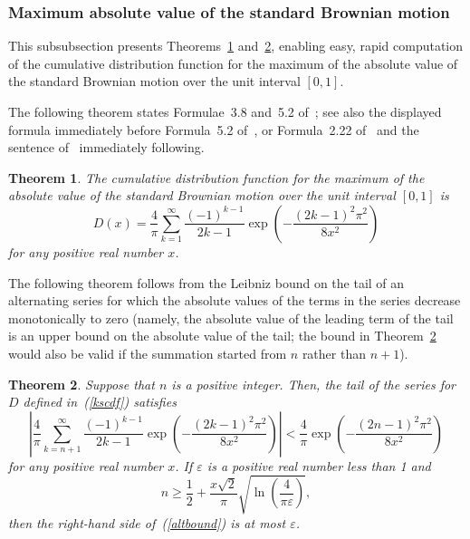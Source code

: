 \documentclass[12pt]{article}
\newtheorem{theorem}{Theorem}[]
\def\epsilon{\varepsilon}
\begin{document}
\subsubsection{Maximum absolute value of the standard Brownian motion}
\label{maxBrownian}

This subsubsection presents Theorems~\ref{maincombomax}
and~\ref{mainboundmax}, enabling easy, rapid computation
of the cumulative distribution function for the maximum
of the absolute value of the standard Brownian motion
over the unit interval $[0, 1]$.

The following theorem states Formulae~3.8 and~5.2
of~\citet{darling-siegert}; see also the displayed formula immediately before
Formula~5.2 of~\citet{darling-siegert},
or Formula~2.22 of~\citet{ciesielski-taylor}
and the sentence of~\citet{ciesielski-taylor} immediately following.
%
\begin{theorem}
\label{maincombomax}
The cumulative distribution function for the maximum of the absolute value
of the standard Brownian motion over the unit interval $[0, 1]$ is
%
\begin{equation}
\label{kscdf}
D(x) = \frac{4}{\pi} \sum_{k=1}^\infty \frac{(-1)^{k-1}}{2k-1}
\exp\left(-\frac{(2k-1)^2 \pi^2}{8x^2}\right)
\end{equation}
%
for any positive real number $x$.
\end{theorem}


The following theorem follows from the Leibniz bound on the tail
of an alternating series for which the absolute values of the terms
in the series decrease monotonically to zero (namely, the absolute value
of the leading term of the tail is an upper bound on the absolute value
of the tail; the bound in Theorem~\ref{mainboundmax} would also be valid
if the summation started from $n$ rather than $n+1$).
%
\begin{theorem}
\label{mainboundmax}
Suppose that $n$ is a positive integer.
Then, the tail of the series for $D$ defined in~(\ref{kscdf}) satisfies
%
\begin{equation}
\label{altbound}
\left| \frac{4}{\pi} \sum_{k=n+1}^\infty \frac{(-1)^{k-1}}{2k-1}
\exp\left(-\frac{(2k-1)^2 \pi^2}{8x^2}\right) \right|
< \frac{4}{\pi} \exp\left(-\frac{(2n-1)^2 \pi^2}{8x^2}\right)
\end{equation}
%
for any positive real number $x$.
If $\epsilon$ is a positive real number less than 1 and
%
\begin{equation}
\label{ksterms}
n \ge \frac{1}{2}
+ \frac{x\sqrt{2}}{\pi} \sqrt{\ln\left(\frac{4}{\pi \epsilon}\right)},
\end{equation}
%
then the right-hand side of~(\ref{altbound}) is at most $\epsilon$.
\end{theorem}
\end{document}
